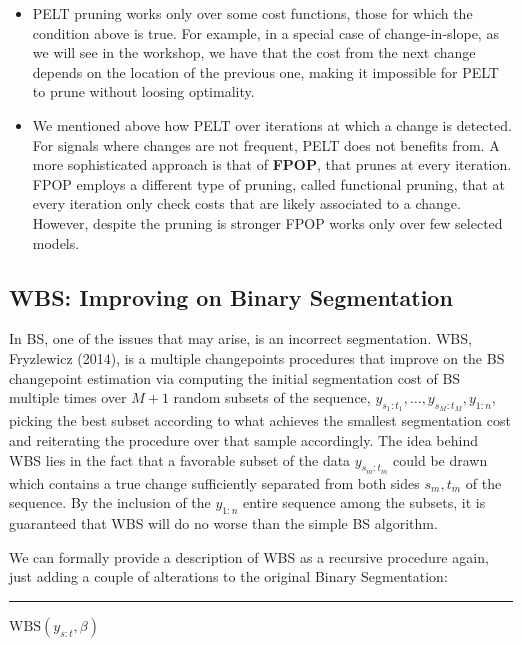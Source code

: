 \documentclass[
  letterpaper,
  DIV=11,
  numbers=noendperiod]{scrreprt}
\begin{document}
\begin{itemize}
\item
  PELT pruning works only over some cost functions, those for which the
  condition above is true. For example, in a special case of
  change-in-slope, as we will see in the workshop, we have that the cost
  from the next change depends on the location of the previous one,
  making it impossible for PELT to prune without loosing optimality.
\item
  We mentioned above how PELT over iterations at which a change is
  detected. For signals where changes are not frequent, PELT does not
  benefits from. A more sophisticated approach is that of \textbf{FPOP},
  that prunes at every iteration. FPOP employs a different type of
  pruning, called functional pruning, that at every iteration only check
  costs that are likely associated to a change. However, despite the
  pruning is stronger FPOP works only over few selected models.
\end{itemize}

\subsection{WBS: Improving on Binary
Segmentation}\label{wbs-improving-on-binary-segmentation}

In BS, one of the issues that may arise, is an incorrect segmentation.
WBS, Fryzlewicz (2014), is a multiple changepoints procedures that
improve on the BS changepoint estimation via computing the initial
segmentation cost of BS multiple times over \(M + 1\) random subsets of
the sequence, \(y_{s_1:t_1}, \dots, y_{s_M:t_M}, y_{1:n}\), picking the
best subset according to what achieves the smallest segmentation cost
and reiterating the procedure over that sample accordingly. The idea
behind WBS lies in the fact that a favorable subset of the data
\(y_{s_m:t_m}\) could be drawn which contains a true change sufficiently
separated from both sides \(s_m, t_m\) of the sequence. By the inclusion
of the \(y_{1:n}\) entire sequence among the subsets, it is guaranteed
that WBS will do no worse than the simple BS algorithm.

We can formally provide a description of WBS as a recursive procedure
again, just adding a couple of alterations to the original Binary
Segmentation:

\begin{center}\rule{0.5\linewidth}{0.5pt}\end{center}

\(\text{WBS}(y_{s:t}, \beta)\)\\
\end{document}
